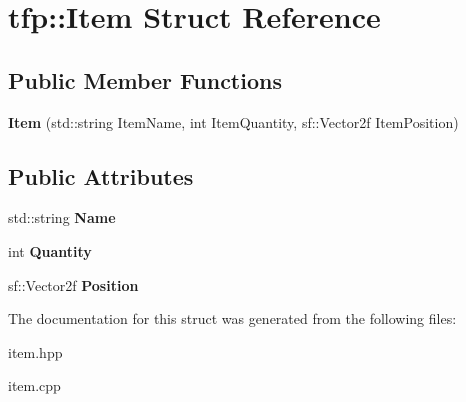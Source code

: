 \hypertarget{structtfp_1_1_item}{}\section{tfp\+:\+:Item Struct Reference}
\label{structtfp_1_1_item}
\subsection*{Public Member Functions}
\begin{DoxyCompactItemize}
\item 
\mbox{\label{structtfp_1_1_item_a6425e253c74f8dbd958a1806ee8e75f2}} 
{\bfseries Item} (std\+::string Item\+Name, int Item\+Quantity, sf\+::\+Vector2f Item\+Position)
\end{DoxyCompactItemize}
\subsection*{Public Attributes}
\begin{DoxyCompactItemize}
\item 
\mbox{\label{structtfp_1_1_item_a4eba77c767a39a254977c36e3d46c9ee}} 
std\+::string {\bfseries Name}
\item 
\mbox{\label{structtfp_1_1_item_acd1c33e59e1a81d58159f8ff59feb9d2}} 
int {\bfseries Quantity}
\item 
\mbox{\label{structtfp_1_1_item_a0ac6c71c4b4bf13e9d117c9ff924e9ca}} 
sf\+::\+Vector2f {\bfseries Position}
\end{DoxyCompactItemize}


The documentation for this struct was generated from the following files\+:\begin{DoxyCompactItemize}
\item 
item.\+hpp\item 
item.\+cpp\end{DoxyCompactItemize}
